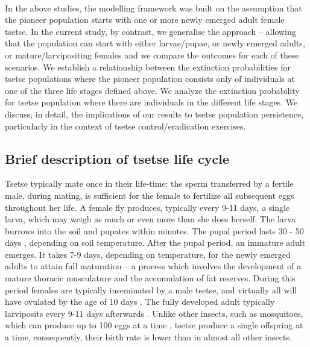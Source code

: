 \documentclass[smallextended]{svjour3}
\begin{document}
\paragraph{}
In the above studies, the modelling framework was built on the assumption that the pioneer population starts with one or more newly emerged adult female tsetse. In the current study, by contrast, we  generalise the approach – allowing that the population can start with either larvae/pupae, or newly emerged adults, or mature/larvipositing females and we compare the outcomes for each of these scenarios. We establish a relationship between the extinction probabilities for tsetse populations where the pioneer population consists only of individuals at one of the three life stages defined above. We analyze the extinction probability for tsetse population where there are individuals in the different life stages. We discuss, in detail, the implications of our results to tsetse population persistence, particularly in the context of tsetse control/eradication exercises. 

\paragraph{}
\subsection{Brief description of tsetse life cycle}

Tsetse typically mate once in their life-time: the sperm transferred by a fertile male, during mating, is sufficient for the female to fertilize all subsequent eggs throughout her life. A female fly produces, typically every 9-11 days, a single larva, which may weigh as much or even more than she does herself.  The larva burrows into the soil and pupates within minutes. The pupal period lasts 30 - 50 days \cite{PhelpsR.J.&Burrows}, depending on soil temperature. After the pupal period, an immature adult emerges. It takes 7-9 days, depending on temperature, for the newly emerged adults to attain full maturation – a process which involves the development of a mature thoracic musculature and the accumulation of fat reserves. During this period females are typically inseminated by a male tsetse, and virtually all will have ovulated by the age of 10 days \cite{Hargrove2012c}. The fully developed adult typically larviposits every 9-11 days afterwards \cite{Hargrove2019}. Unlike other insects, such as mosquitoes, which can produce up to 100 eggs at a time \cite{Clemons2010}, tsetse produce a single offspring at a time, consequently, their birth rate is lower than in almost all other insects. 
\end{document}
